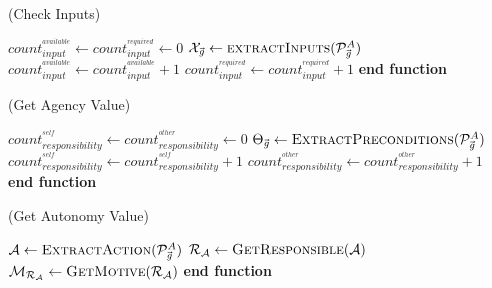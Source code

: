 \documentclass{article}
\begin{document}
\begin{algorithm}
	\caption{(Check Inputs)}
	\label{array-sum}
	\begin{algorithmic}[1]
			\Statex
			\State $count_{input}^{^{available}} \gets count_{input}^{^{required}} \gets
			0$
			\Statex
			\State $\mathcal{X}_{\vec{\mathit{g}}} \gets
			\Call{extractInputs}{\mathcal{P}_{\vec{\mathit{g}}}^{A}}$
			\Statex
					\State $count_{input}^{^{available}} \gets count_{input}^{^{available}} + 1$
				\EndIf
				\State $count_{input}^{^{required}} \gets count_{input}^{^{required}} + 1$
			\EndFor
			\Statex
			\State {}
		\EndFunction 
	\State \textbf{end function}
	\end{algorithmic}
\end{algorithm}

\begin{algorithm}
	\caption{(Get Agency Value)}
	\label{array-sum}
	\begin{algorithmic}[1]
			\Statex
			\State $count_{responsibility}^{^{self}} \gets
			count_{responsibility}^{^{other}} \gets 0$
			\Statex
			\State $\Theta_{\vec{\mathit{g}}} \gets
			\Call{ExtractPreconditions}{\mathcal{P}_{\vec{\mathit{g}}}^{A}}$
			\Statex
					\State $count_{responsibility}^{^{self}} \gets count_{responsibility}^{^{self}} + 1$
				\Else
					\State $count_{responsibility}^{^{other}} \gets
				count_{responsibility}^{^{other}} + 1$
				\EndIf
			\EndFor
			\Statex
			\State {}
		\EndFunction 
	\State \textbf{end function}
	\end{algorithmic}
\end{algorithm}

\begin{algorithm}
	\caption{(Get Autonomy Value)}
	\label{array-sum}
	\begin{algorithmic}[1]
			\Statex
			\State $\mathcal{A} \gets
			\Call{ExtractAction}{\mathcal{P}_{\vec{\mathit{g}}}^{A}}$ 
			\State $\mathcal{R}_{\mathcal{A}} \gets \Call{GetResponsible}{\mathcal{A}}$
			\State $\mathcal{M}_{\mathcal{R}_{\mathcal{A}}} \gets
			\Call{GetMotive}{\mathcal{R}_{\mathcal{A}}}$
			\Statex
				\State {}
			\Else
				\State {}
			\EndIf
		\EndFunction 
	\State \textbf{end function}
	\end{algorithmic}
\end{algorithm}
\end{document}
